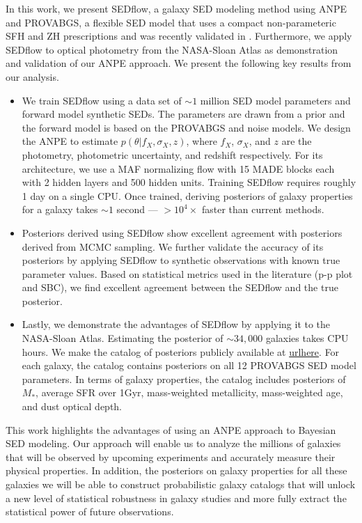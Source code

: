 In this work, we present {\sc SEDflow}, a galaxy SED modeling method using ANPE
and PROVABGS, a flexible SED model that uses a compact non-parameteric SFH and
ZH prescriptions and was recently validated in \cite{hahn2022}.
Furthermore, we apply {\sc SEDflow} to optical photometry from the NASA-Sloan
Atlas as demonstration and validation of our ANPE approach.  
We present the following key results from our analysis.
\begin{itemize}
    \item We train {\sc SEDflow} using a data set of ${\sim}1$ million SED
        model parameters and forward model synthetic SEDs.
        The parameters are drawn from a prior and the forward model is based on
        the PROVABGS and noise models. 
        We design the ANPE to estimate $p(\theta | f_X, \sigma_X, z)$, where
        $f_X$, $\sigma_X$, and $z$ are the photometry, photometric uncertainty,
        and redshift respectively. 
        For its architecture, we use a MAF normalizing flow with 15 MADE blocks
        each with 2 hidden layers and 500 hidden units.
        Training {\sc SEDflow} requires roughly 1 day on a single CPU. 
        Once trained, deriving posteriors of galaxy properties for a galaxy
        takes ${\sim}1$ second --- $>10^4\times$ faster than current 
        methods.
    \item Posteriors derived using {\sc SEDflow} show excellent agreement with
        posteriors derived from MCMC sampling. 
        We further validate the accuracy of its posteriors by applying  {\sc
        SEDflow} to synthetic observations with known true parameter values.  
        Based on statistical metrics used in the literature (p-p plot and SBC),
        we find excellent agreement between the {\sc SEDflow} and the true
        posterior. 
    \item Lastly, we demonstrate the advantages of {\sc SEDflow} by applying it
        to the NASA-Sloan Atlas.
        Estimating the posterior of ${\sim}34,000$ galaxies takes  
        CPU hours. 
        We make the catalog of posteriors publicly available at \url{urlhere}. 
        For each galaxy, the catalog contains posteriors on all 12 PROVABGS
        SED model parameters.
        In terms of galaxy properties, the catalog includes posteriors of
        $M_*$, average SFR over 1Gyr, mass-weighted metallicity, mass-weighted
        age, and dust optical depth. 
\end{itemize}

This work highlights the advantages of using an ANPE approach to Bayesian SED
modeling.  
Our approach will enable us to analyze the millions of galaxies that will be
observed by upcoming experiments and accurately measure their physical
properties. 
In addition, the posteriors on galaxy properties for all these galaxies we will
be able to construct probabilistic galaxy catalogs that will unlock a new level
of statistical robustness in galaxy studies and more fully extract the
statistical power of future observations.

